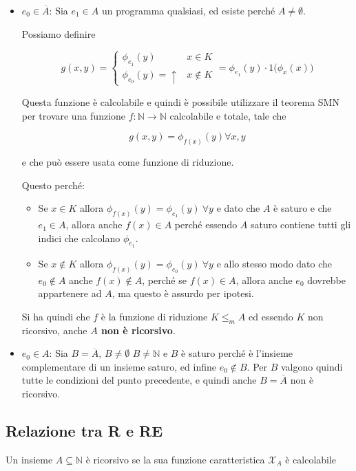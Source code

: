 \begin{itemize}
	\item $e_0 \in \overline{A}$: Sia $e_1 \in A$ un programma qualsiasi, ed esiste perché $A \neq \emptyset$.
	
	Possiamo definire
	
	$$
	g(x,y) = \begin{cases}
	\phi_{e_1}(y) &x \in K \\
	\phi_{e_0}(y) = \uparrow & x \notin K
	\end{cases} = \phi_{e_1}(y) \cdot 1 \big( \phi_x(x) \big)
	$$ 
	
	Questa funzione è calcolabile e quindi è possibile utilizzare il teorema SMN per trovare una funzione $f : \mathbb{N} \rightarrow \mathbb{N}$ calcolabile e totale, tale che 
	
	$$
	g(x,y) = \phi_{f(x)}(y) \forall x,y
	$$
	
	e che può essere usata come funzione di riduzione.
	
	Questo perché:
	\begin{itemize}
		\item Se $x	\in K$ allora $\phi_{f(x)}(y) = \phi_{e_1}(y) \: \forall y$ e dato che $A$ è saturo e che $e_1 \in A$, allora anche $f(x) \in A$ perché essendo $A$ saturo contiene tutti gli indici che calcolano $\phi_{e_1} $.
		\item Se $x \notin K$ allora $\phi_{f(x)}(y) = \phi_{e_0}(y) \: \forall y$ e allo stesso modo dato che $e_0 \notin A$ anche $f(x) \notin A$, perché se $f(x) \in A$, allora anche $e_0$ dovrebbe appartenere ad $A$, ma questo è assurdo per ipotesi.
	\end{itemize}
	
	Si ha quindi che $f$ è la funzione di riduzione $K \leq_m A$ ed essendo $K$ non ricorsivo, anche \textbf{$A$ non è ricorsivo}.
	
	\item $e_0 \in A$: Sia $B = \overline{A}$, $B \neq \emptyset$ $B \neq \mathbb{N}$ e $B$ è saturo perché è l'insieme complementare di un insieme saturo, ed infine $e_0 \notin B$. Per $B$ valgono quindi tutte le condizioni del punto precedente, e quindi anche $B = \overline{A}$ non è ricorsivo.
\end{itemize} 


\subsection{Relazione tra R e RE}

Un insieme $A \subseteq \mathbb{N}$ è ricorsivo se la sua funzione caratteristica $\mathcal{X}_A$ è calcolabile

